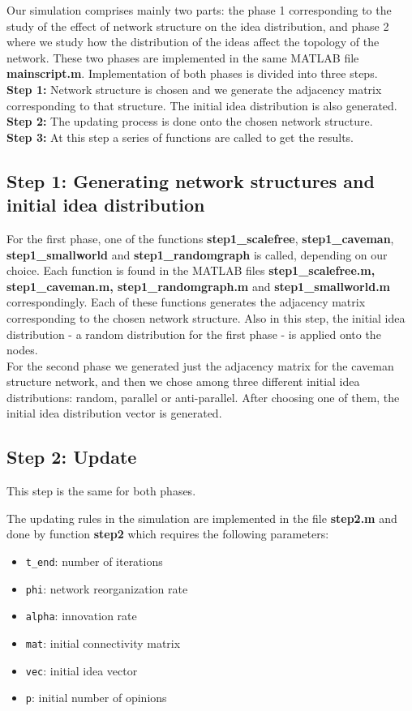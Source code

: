Our simulation comprises mainly two parts: the phase 1 corresponding to the study  of the effect of network structure on the idea distribution, and phase 2 where we study how the distribution of the ideas affect the topology of the network. These two phases are implemented in the same MATLAB file \textbf{mainscript.m}. Implementation of both phases is divided into three steps. 
\\

\noindent \textbf{Step 1:} Network structure is chosen and we generate the adjacency matrix corresponding to that structure. The initial idea distribution is also generated.\\
\textbf{Step 2:} The updating process is done onto the chosen network structure.\\
\textbf{Step 3:} At this step a series of functions are called to get the results.

\subsection{Step 1: Generating network structures and initial idea distribution}

For the first phase, one of the functions \textbf{step1\_scalefree}, \textbf{step1\_caveman},\\ \textbf{step1\_smallworld} and \textbf{step1\_randomgraph} is called, depending on our choice. Each function is found in the MATLAB files \textbf{step1\_scalefree.m, step1\_caveman.m, step1\_randomgraph.m} and \textbf{step1\_smallworld.m} correspondingly.  Each of these functions generates the adjacency matrix corresponding to the chosen network structure. Also in this step, the initial idea distribution - a random distribution for the first phase - is applied onto the nodes. 
\\
For the second phase we generated just the adjacency matrix for the caveman structure network, and then we chose among three different initial idea distributions: random, parallel or anti-parallel. After choosing one of them, the initial idea distribution vector is generated.


\subsection{Step 2: Update}

This step is the same for both phases.

The updating rules in the simulation are implemented in the file \textbf{step2.m} and done by function \textbf{step2} which requires the following parameters:
\begin{itemize}

\item \verb+t_end+: number of iterations
 \item \verb+phi+:  network reorganization rate
 \item \verb+alpha+: innovation rate
\item \verb+mat+: initial connectivity matrix
\item  \verb+vec+: initial idea vector
\item \verb+p+: initial number of opinions
 \end{itemize}
 
